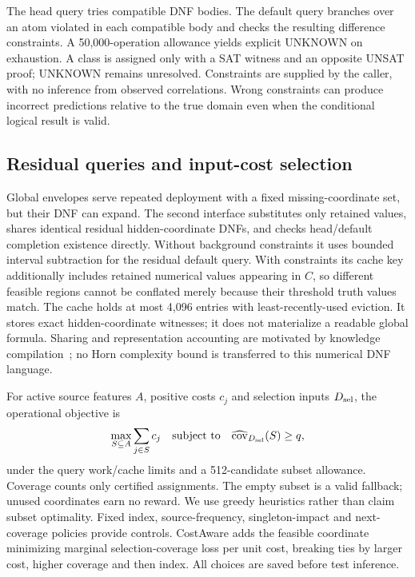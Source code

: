 The head query tries compatible DNF bodies. The default query branches over an atom violated in each compatible body and checks the resulting difference constraints. A 50,000-operation allowance yields explicit UNKNOWN on exhaustion. A class is assigned only with a SAT witness and an opposite UNSAT proof; UNKNOWN remains unresolved. Constraints are supplied by the caller, with no inference from observed correlations. Wrong constraints can produce incorrect predictions relative to the true domain even when the conditional logical result is valid.

\subsection{Residual queries and input-cost selection}\label{sec:cost-forgetting}
Global envelopes serve repeated deployment with a fixed missing-coordinate set, but their DNF can expand. The second interface substitutes only retained values, shares identical residual hidden-coordinate DNFs, and checks head/default completion existence directly. Without background constraints it uses bounded interval subtraction for the residual default query. With constraints its cache key additionally includes retained numerical values appearing in $C$, so different feasible regions cannot be conflated merely because their threshold truth values match. The cache holds at most 4,096 entries with least-recently-used eviction. It stores exact hidden-coordinate witnesses; it does not materialize a readable global formula. Sharing and representation accounting are motivated by knowledge compilation~\citep{zeyen2026divkc,liberatore2024commonsize}; no Horn complexity bound is transferred to this numerical DNF language.

For active source features $A$, positive costs $c_j$ and selection inputs $D_{\rm sel}$, the operational objective is
\begin{equation}
 \max_{S\subseteq A}\sum_{j\in S}c_j\quad\text{subject to}\quad
 \widehat{\operatorname{cov}}_{D_{\rm sel}}(S)\geq q,
\end{equation}
under the query work/cache limits and a 512-candidate subset allowance. Coverage counts only certified assignments. The empty subset is a valid fallback; unused coordinates earn no reward. We use greedy heuristics rather than claim subset optimality. Fixed index, source-frequency, singleton-impact and next-coverage policies provide controls. CostAware adds the feasible coordinate minimizing marginal selection-coverage loss per unit cost, breaking ties by larger cost, higher coverage and then index. All choices are saved before test inference.

